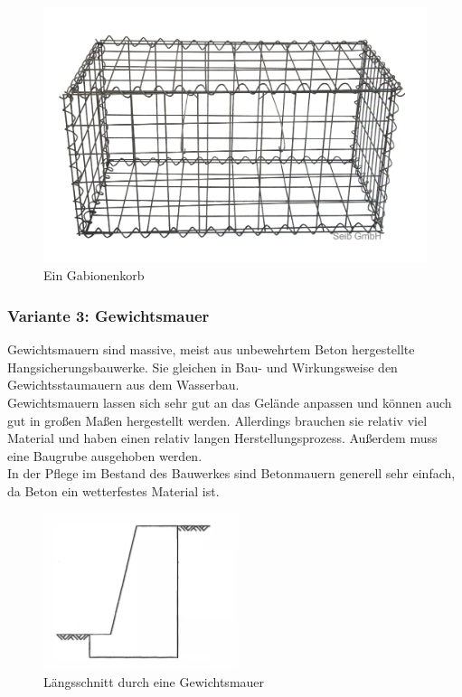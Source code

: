 \documentclass[11pt,fleqn,a4paper,halfparskip]{article}
\begin{document}
\begin{figure}[h!]
\includegraphics[scale=0.2]{gabione.jpg}
\caption{Ein Gabionenkorb \cite{gabio2}}
\end{figure}
\newpage
\subsubsection*{Variante 3: Gewichtsmauer}
Gewichtsmauern sind massive, meist aus unbewehrtem Beton hergestellte Hangsicherungsbauwerke. Sie gleichen in Bau- und Wirkungsweise den Gewichtsstaumauern aus dem Wasserbau. \\
Gewichtsmauern lassen sich sehr gut an das Gelände anpassen und können auch gut in großen Maßen hergestellt werden. Allerdings brauchen sie relativ viel Material und haben einen relativ langen Herstellungsprozess. Außerdem muss eine Baugrube ausgehoben werden. \\
In der Pflege im Bestand des Bauwerkes sind Betonmauern generell sehr einfach, da Beton ein wetterfestes Material ist.
\begin{figure}[h!]
\includegraphics[scale=0.8]{gewichtsmauer.png}
\caption{Längsschnitt durch eine Gewichtsmauer \cite[11.63]{gewichtsmauer}}
\end{figure}
\end{document}
